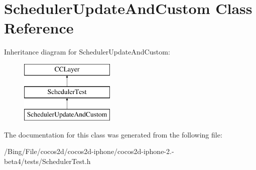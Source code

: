 \hypertarget{interface_scheduler_update_and_custom}{\section{Scheduler\-Update\-And\-Custom Class Reference}
\label{interface_scheduler_update_and_custom}
}
Inheritance diagram for Scheduler\-Update\-And\-Custom\-:\begin{figure}[H]
\begin{center}
\leavevmode
\includegraphics[height=3.000000cm]{interface_scheduler_update_and_custom}
\end{center}
\end{figure}


The documentation for this class was generated from the following file\-:\begin{DoxyCompactItemize}
\item 
/\-Bing/\-File/cocos2d/cocos2d-\/iphone/cocos2d-\/iphone-\/2.-\/beta4/tests/Scheduler\-Test.\-h\end{DoxyCompactItemize}

